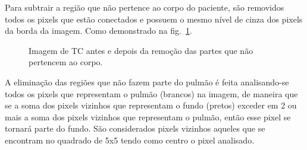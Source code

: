 Para subtrair a região que não pertence ao corpo do paciente, são removidos todos os pixels que estão conectados e possuem o mesmo nível de cinza dos pixels da borda da imagem. Como demonstrado na fig.~\ref{fig:remocao}.

\begin{figure}[ht]
 \begin{center}
 \end{center}
 \caption{Imagem de TC antes e depois da remoção das partes que não pertencem ao corpo.}
 \label{fig:remocao}
\end{figure}

A eliminação das regiões que não fazem parte do pulmão é feita analisando-se todos os pixels que representam o pulmão (brancos) na imagem, de maneira que se a soma dos pixels vizinhos que representam o fundo (pretos) exceder em 2 ou mais a soma dos pixels vizinhos que representam o pulmão, então esse pixel se tornará parte do fundo. São considerados pixels vizinhos aqueles que se encontram no quadrado de 5x5 tendo como centro o pixel analisado.

